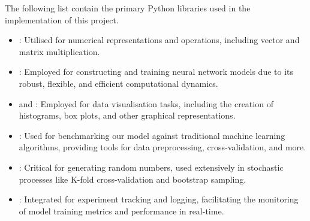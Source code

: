 \documentclass[12pt]{article}
\begin{document}
The following list contain the primary Python libraries used in the implementation of this project.

\vspace{-6pt}

\begin{itemize}
\setlength\itemsep{-0.3em}
  \item {}: Utilised for numerical representations and operations, including vector and matrix multiplication.
  \item {}: Employed for constructing and training neural network models due to its robust, flexible, and efficient computational dynamics.
  \item {} and : Employed for data visualisation tasks, including the creation of histograms, box plots, and other graphical representations.
  \item {}: Used for benchmarking our model against traditional machine learning algorithms, providing tools for data preprocessing, cross-validation, and more.
  \item {}: Critical for generating random numbers, used extensively in stochastic processes like K-fold cross-validation and bootstrap sampling.
  \item {}: Integrated for experiment tracking and logging, facilitating the monitoring of model training metrics and performance in real-time.
\end{itemize}
\end{document}
